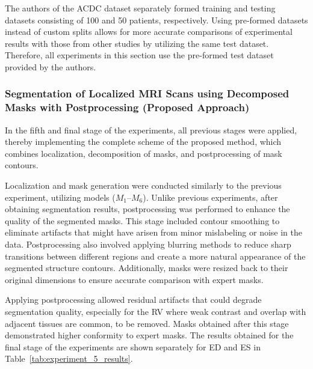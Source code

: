 \documentclass[fleqn,10pt]{wlscirep}
\begin{document}
The authors of the ACDC dataset \cite{Bernard:2018} separately formed training and testing datasets consisting of 100 and 50 patients, respectively. Using pre-formed datasets instead of custom splits allows for more accurate comparisons of experimental results with those from other studies by utilizing the same test dataset. Therefore, all experiments in this section use the pre-formed test dataset provided by the authors.

\subsubsection*{Segmentation of Localized MRI Scans using Decomposed Masks with Postprocessing (Proposed Approach)}

In the fifth and final stage of the experiments, all previous stages were applied, thereby implementing the complete scheme of the proposed method, which combines localization, decomposition of masks, and postprocessing of mask contours.

Localization and mask generation were conducted similarly to the previous experiment, utilizing models (\({M_1}\)--\({M_6}\)). Unlike previous experiments, after obtaining segmentation results, postprocessing was performed to enhance the quality of the segmented masks. This stage included contour smoothing to eliminate artifacts that might have arisen from minor mislabeling or noise in the data. Postprocessing also involved applying blurring methods to reduce sharp transitions between different regions and create a more natural appearance of the segmented structure contours. Additionally, masks were resized back to their original dimensions to ensure accurate comparison with expert masks.

Applying postprocessing allowed residual artifacts that could degrade segmentation quality, especially for the RV where weak contrast and overlap with adjacent tissues are common, to be removed. Masks obtained after this stage demonstrated higher conformity to expert masks.
The results obtained for the final stage of the experiments are shown separately for ED and ES in Table~\ref{tab:experiment_5_results}.
\end{document}
